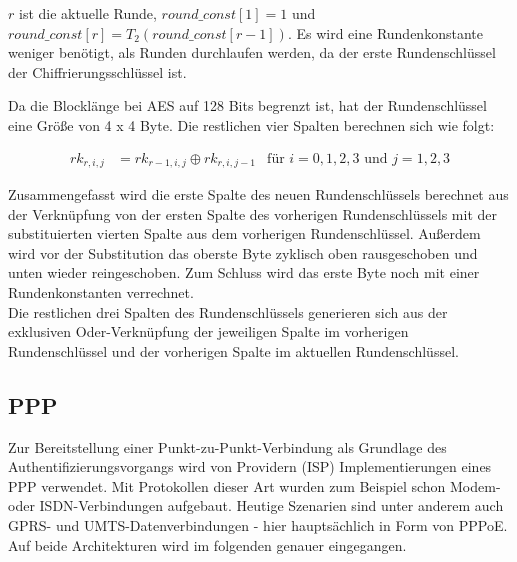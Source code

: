    $r$ ist die aktuelle Runde, $round\_const[1] = 1$ und $round\_const[r] = T_2(round\_const[r-1])$. Es wird eine
   Rundenkonstante weniger benötigt, als Runden durchlaufen werden, da der erste Rundenschlüssel der 
   Chiffrierungs\-schlüssel ist.
   
   Da die Blocklänge bei AES auf 128 Bits begrenzt ist, hat der Rundenschlüssel eine Größe von 4 x 4 Byte. Die
   restlichen vier Spalten berechnen sich wie folgt:
   
    \begin{equation*}
     \begin{aligned}
      rk_{r,i,j} &= rk_{r-1,i,j} \oplus rk_{r,i,j-1} &\text{für $i = 0, 1, 2, 3$ und $j = 1, 2, 3$}
     \end{aligned}
    \end{equation*}
    
   Zusammengefasst wird die erste Spalte des neuen Rundenschlüssels berechnet aus der Verknüpfung
   von der ersten Spalte des vorherigen Rundenschlüssels mit der substituierten vierten Spalte aus dem vorherigen
   Rundenschlüssel. Außerdem wird vor der Substitution das oberste Byte zyklisch oben rausgeschoben und unten
   wieder reingeschoben. Zum Schluss wird das erste Byte noch mit einer Rundenkonstanten verrechnet. \\
   Die restlichen drei Spalten des Rundenschlüssels generieren sich aus der exklusiven Oder-Verknüpfung der
   jeweiligen Spalte im vorherigen Rundenschlüssel und der vorherigen Spalte im aktuellen Rundenschlüssel.

\subsection{PPP}
Zur Bereitstellung einer Punkt-zu-Punkt-Verbindung als Grundlage des Authentifizierungsvorgangs
wird von Providern (\ac{ISP}) Implementierungen eines
\ac{PPP} verwendet. Mit Protokollen dieser Art wurden zum Beispiel schon Modem- oder ISDN-Verbindungen
aufgebaut. Heutige Szenarien sind unter anderem auch GPRS- und UMTS-Datenverbindungen -
hier hauptsächlich in
Form von \ac{PPPoE}. Auf beide Architekturen wird im folgenden
genauer eingegangen.



